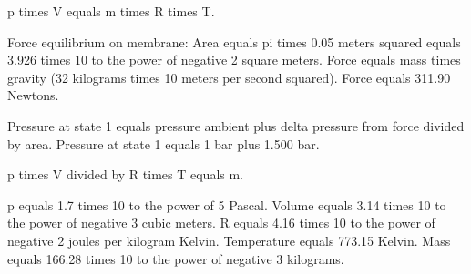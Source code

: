 p times V equals m times R times T.  

Force equilibrium on membrane:  
Area equals pi times 0.05 meters squared equals 3.926 times 10 to the power of negative 2 square meters.  
Force equals mass times gravity (32 kilograms times 10 meters per second squared). Force equals 311.90 Newtons.  

Pressure at state 1 equals pressure ambient plus delta pressure from force divided by area.  
Pressure at state 1 equals 1 bar plus 1.500 bar.  

p times V divided by R times T equals m.  

p equals 1.7 times 10 to the power of 5 Pascal.  
Volume equals 3.14 times 10 to the power of negative 3 cubic meters.  
R equals 4.16 times 10 to the power of negative 2 joules per kilogram Kelvin.  
Temperature equals 773.15 Kelvin.  
Mass equals 166.28 times 10 to the power of negative 3 kilograms.